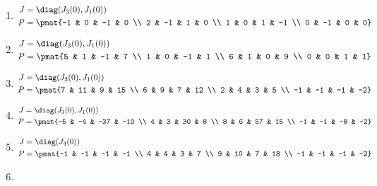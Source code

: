 \begin{enumerate}
\item

\begin{align*}
J &= \diag(J_{3}(0), J_{1}(0))\\
P &= \pmat{-1 & 0 & -1 & 0 \\ 2 & -1 & 1 & 0 \\ 1 & 0 & 1 & -1 \\ 0 & -1 & 0 & 0}
\end{align*}

\item

\begin{align*}
J &= \diag(J_{3}(0), J_{1}(0))\\
P &= \pmat{5 & 1 & -1 & 7 \\ 1 & 0 & -1 & 1 \\ 6 & 1 & 0 & 9 \\ 0 & 0 & 1 & 1}
\end{align*}

\item

\begin{align*}
J &= \diag(J_{3}(0), J_{1}(0))\\
P &= \pmat{7 & 11 & 9 & 15 \\ 6 & 9 & 7 & 12 \\ 2 & 4 & 3 & 5 \\ -1 & -1 & -1 & -2}
\end{align*}

\item

\begin{align*}
J &= \diag(J_{3}(0), J_{1}(0))\\
P &= \pmat{-5 & -4 & -37 & -10 \\ 4 & 3 & 30 & 8 \\ 8 & 6 & 57 & 15 \\ -1 & -1 & -8 & -2}
\end{align*}

\item

\begin{align*}
J &= \diag(J_{4}(0))\\
P &= \pmat{-1 & -1 & -1 & -1 \\ 4 & 4 & 3 & 7 \\ 9 & 10 & 7 & 18 \\ -1 & -1 & -1 & -2}
\end{align*}

\item


\end{enumerate}

